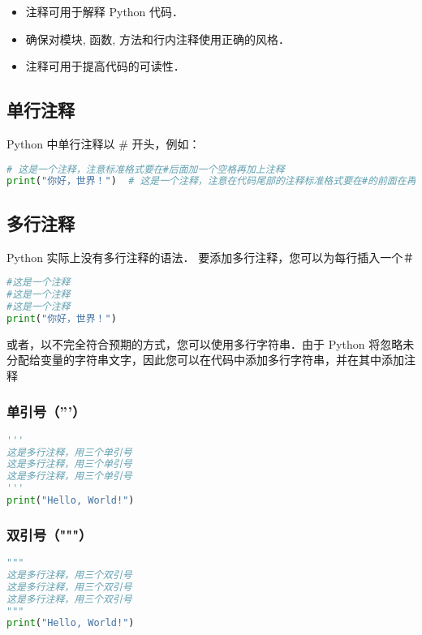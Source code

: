 

\begin{itemize}
\item 注释可用于解释 Python 代码．
\item 确保对模块, 函数, 方法和行内注释使用正确的风格．
\item 注释可用于提高代码的可读性．
\end{itemize}

\subsection{单行注释}
Python 中单行注释以 # 开头，例如：
\begin{lstlisting}[language=python]
# 这是一个注释，注意标准格式要在#后面加一个空格再加上注释
print("你好，世界！")  # 这是一个注释，注意在代码尾部的注释标准格式要在#的前面在再加两个空格
\end{lstlisting}

\subsection{多行注释}
Python 实际上没有多行注释的语法．
要添加多行注释，您可以为每行插入一个＃
\begin{lstlisting}[language=python]
#这是一个注释
#这是一个注释
#这是一个注释
print("你好，世界！")
\end{lstlisting}

或者，以不完全符合预期的方式，您可以使用多行字符串．由于 Python 将忽略未分配给变量的字符串文字，因此您可以在代码中添加多行字符串，并在其中添加注释
\subsubsection{单引号（'''）}
\begin{lstlisting}[language=python]
'''
这是多行注释，用三个单引号
这是多行注释，用三个单引号 
这是多行注释，用三个单引号
'''
print("Hello, World!")
\end{lstlisting}

\subsubsection{双引号（"""）}
\begin{lstlisting}[language=python]
"""
这是多行注释，用三个双引号
这是多行注释，用三个双引号 
这是多行注释，用三个双引号
"""
print("Hello, World!")
\end{lstlisting}

